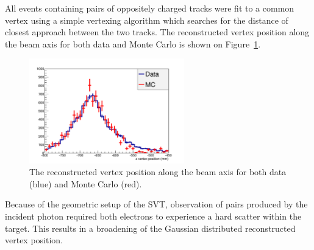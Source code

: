 

All events containing pairs of oppositely charged tracks were fit to a
common vertex using a simple vertexing algorithm which searches for the distance
of closest approach between the two tracks.  The reconstructed vertex position
along the beam axis for both data and Monte Carlo is shown on 
Figure~\ref{fig:vz_position}.
\begin{figure}[h]
    \begin{center}
    	\includegraphics[width=0.60\textwidth]{test2012/svtperformance/trk_performance/zvertex.pdf}
        \caption{  
                    The reconstructed vertex position along the beam axis for
                    both data (blue) and Monte Carlo (red).
                } 
	\label{fig:vz_position}
    \end{center}
\end{figure}
Because of the geometric setup of the SVT, observation of pairs produced by
the incident photon required both electrons to experience a hard scatter
within the target.  This results in a broadening of the Gaussian 
distributed reconstructed vertex position. 

